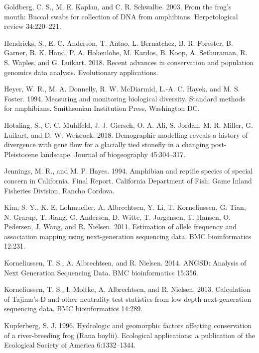 \documentclass[twoside,12pt,final]{ucthesis-CA2012} %
\begin{document}
\begin{ucmainmatter}
\leavevmode\hypertarget{ref-goldberg_frogs_2003}{}%
Goldberg, C. S., M. E. Kaplan, and C. R. Schwalbe. 2003. From the frog's
mouth: Buccal swabs for collection of DNA from amphibians.
Herpetological review 34:220--221.

\leavevmode\hypertarget{ref-hendricks_recent_2018}{}%
Hendricks, S., E. C. Anderson, T. Antao, L. Bernatchez, B. R. Forester,
B. Garner, B. K. Hand, P. A. Hohenlohe, M. Kardos, B. Koop, A.
Sethuraman, R. S. Waples, and G. Luikart. 2018. Recent advances in
conservation and population genomics data analysis. Evolutionary
applications.

\leavevmode\hypertarget{ref-heyer_measuring_1994}{}%
Heyer, W. R., M. A. Donnelly, R. W. McDiarmid, L.-A. C. Hayek, and M. S.
Foster. 1994. Measuring and monitoring biological diversity. Standard
methods for amphibians. Smithsonian Institution Press, Washington DC.

\leavevmode\hypertarget{ref-hotaling_demographic_2018}{}%
Hotaling, S., C. C. Muhlfeld, J. J. Giersch, O. A. Ali, S. Jordan, M. R.
Miller, G. Luikart, and D. W. Weisrock. 2018. Demographic modelling
reveals a history of divergence with gene flow for a glacially tied
stonefly in a changing post-Pleistocene landscape. Journal of
biogeography 45:304--317.

\leavevmode\hypertarget{ref-jennings_amphibian_1994}{}%
Jennings, M. R., and M. P. Hayes. 1994. Amphibian and reptile species of
special concern in California. Final Report. California Department of
Fish; Game Inland Fisheries Division, Rancho Cordova.

\leavevmode\hypertarget{ref-kim_estimation_2011}{}%
Kim, S. Y., K. E. Lohmueller, A. Albrechtsen, Y. Li, T. Korneliussen, G.
Tian, N. Grarup, T. Jiang, G. Andersen, D. Witte, T. Jorgensen, T.
Hansen, O. Pedersen, J. Wang, and R. Nielsen. 2011. Estimation of allele
frequency and association mapping using next-generation sequencing data.
BMC bioinformatics 12:231.

\leavevmode\hypertarget{ref-korneliussen_angsd:_2014}{}%
Korneliussen, T. S., A. Albrechtsen, and R. Nielsen. 2014. ANGSD:
Analysis of Next Generation Sequencing Data. BMC bioinformatics 15:356.

\leavevmode\hypertarget{ref-korneliussen_calculation_2013}{}%
Korneliussen, T. S., I. Moltke, A. Albrechtsen, and R. Nielsen. 2013.
Calculation of Tajima's D and other neutrality test statistics from low
depth next-generation sequencing data. BMC bioinformatics 14:289.

\leavevmode\hypertarget{ref-kupferberg_hydrologic_1996}{}%
Kupferberg, S. J. 1996. Hydrologic and geomorphic factors affecting
conservation of a river-breeding frog (Rana boylii). Ecological
applications: a publication of the Ecological Society of America
6:1332--1344.


\end{ucmainmatter}
\end{document}
